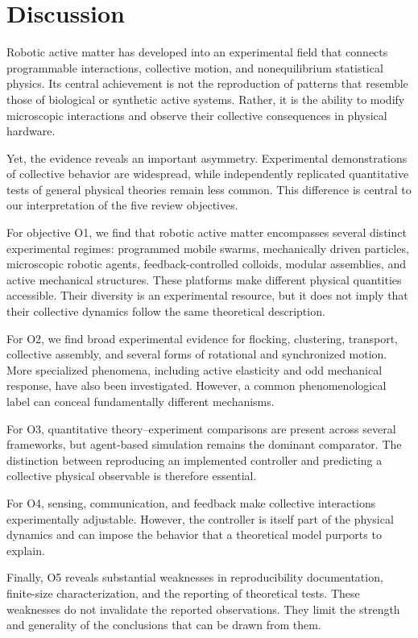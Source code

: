 \section{Discussion}\label{sec:discussion}

Robotic active matter has developed into an experimental
field that connects programmable interactions, collective
motion, and nonequilibrium statistical physics. Its central
achievement is not the reproduction of patterns that resemble
those of biological or synthetic active systems. Rather, it
is the ability to modify microscopic interactions and observe
their collective consequences in physical hardware.

Yet, the evidence reveals an important asymmetry.
Experimental demonstrations of collective behavior are
widespread, while independently replicated quantitative
tests of general physical theories remain less common.
This difference is central to our interpretation of
the five review objectives.

For objective O1, we find that robotic active matter
encompasses several distinct experimental regimes:
programmed mobile swarms, mechanically driven particles,
microscopic robotic agents, feedback-controlled colloids,
modular assemblies, and active mechanical structures.
These platforms make different physical quantities
accessible. Their diversity is an experimental resource,
but it does not imply that their collective dynamics
follow the same theoretical description.

For O2, we find broad experimental evidence for
flocking, clustering, transport, collective assembly,
and several forms of rotational and synchronized
motion. More specialized phenomena, including
active elasticity and odd mechanical response,
have also been investigated. However, a common
phenomenological label can conceal fundamentally
different mechanisms.

For O3, quantitative theory--experiment comparisons
are present across several frameworks, but
agent-based simulation remains the dominant
comparator. The distinction between reproducing
an implemented controller and predicting a
collective physical observable is therefore
essential.

For O4, sensing, communication, and feedback
make collective interactions experimentally
adjustable. However, the controller is itself
part of the physical dynamics and can impose
the behavior that a theoretical model
purports to explain.

Finally, O5 reveals substantial weaknesses
in reproducibility documentation, finite-size
characterization, and the reporting of
theoretical tests. These weaknesses do not
invalidate the reported observations.
They limit the strength and generality
of the conclusions that can be drawn
from them.

